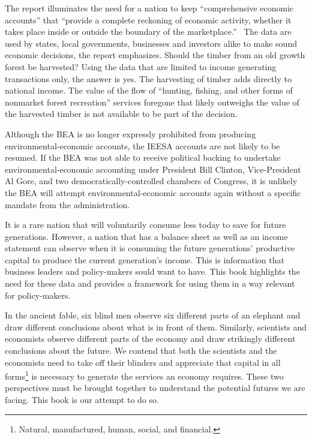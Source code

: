 The report illuminates the need for a nation 
to keep ``comprehensive economic accounts'' that ``provide a complete reckoning of
economic activity, whether it takes place inside or outside 
the boundary of the marketplace.''~\cite[p. 29]{ Nordhaus1999a}
The data are used by states, local governments, businesses and investors alike 
to make sound economic decisions, the report emphasizes. 
Should the timber from an old growth forest be harvested?
Using the data that are limited to income generating transactions only, the answer is yes. 
The harvesting of timber adds directly to national income. 
The value of the flow of ``hunting, fishing, and other forms of nonmarket forest recreation'' 
services foregone that likely outweighs the value of the harvested timber 
is not available to be part of the decision.\cite[p. 30]{ Nordhaus1999a}

Although the BEA is no longer expressly prohibited 
from producing environmental-economic accounts, 
the IEESA accounts are not likely to be resumed. 
If the BEA was not able to receive political backing 
to undertake environmental-economic accounting 
under President Bill Clinton, Vice-President Al Gore, 
and two democratically-controlled chambers of Congress, 
it is unlikely the BEA will attempt environmental-economic accounts again 
without a specific mandate from the administration. 

It is a rare nation that will voluntarily consume less today 
to save for future generations. 
However, a nation that has a balance sheet as well as 
an income statement can observe when it is consuming 
the future generations' productive capital 
to produce the current generation's income. 
This is information that business leaders and policy-makers sould want to have. 
This book highlights the need for these data and 
provides a framework for using them in a way relevant for policy-makers.

In the ancient fable, 
six blind men observe six different parts 
of an elephant and draw different conclusions 
about what is in front of them. 
Similarly, scientists and economists observe 
different parts of the economy and draw strikingly different conclusions 
about the future. 
We contend that both the scientists and the economists 
need to take off their blinders and 
appreciate that capital in all forms\footnote{Natural, 
	manufactured, human, social, and financial.} 
is necessary to generate the services an economy requires. 
These two perspectives must be brought together 
to understand the potential futures we are facing. 
This book is our attempt to do so.

